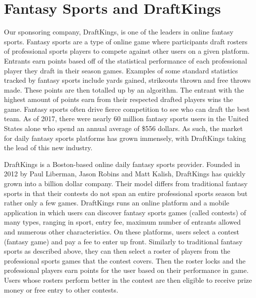\section{Fantasy Sports and DraftKings}
Our sponsoring company, DraftKings, is one of the leaders in online fantasy sports. Fantasy sports are a type of online game where participants draft  rosters of professional sports players to compete against other users on a given platform. Entrants earn points based off of the statistical performance of each professional player they draft in their season games. Examples of some standard statistics tracked by fantasy sports include yards gained, strikeouts thrown and free throws made. These points are then totalled up by an algorithm. The entrant with the highest amount of points earn from their respected drafted players wins the game. Fantasy sports often drive fierce competition to see who can draft the best team. As of 2017, there were nearly 60 million fantasy sports users in the United States alone who spend an annual average of \$556 dollars. As such, the market for daily fantasy sports platforms has grown immensely, with DraftKings taking the lead of this new industry. 

DraftKings is a Boston-based online daily fantasy sports provider. Founded in 2012 by Paul Liberman, Jason Robins and Matt Kalish, DraftKings has quickly grown into a billion dollar company. Their model differs from traditional fantasy sports in that their contests do not span an entire professional sports season but rather only a few games. DraftKings runs an online platform and a mobile application in which users can discover fantasy sports games (called contests) of many types, ranging in sport, entry fee, maximum number of entrants allowed and numerous other characteristics. On these platforms, users select a contest (fantasy game) and pay a fee to enter up front. Similarly to traditional fantasy sports as described above, they can then select a roster of players from the professional sports games that the contest covers. Then the roster locks and the professional players earn points for the user based on their performance in game. Users whose rosters perform better in the contest are then eligible to receive prize money or free entry to other contests. 


